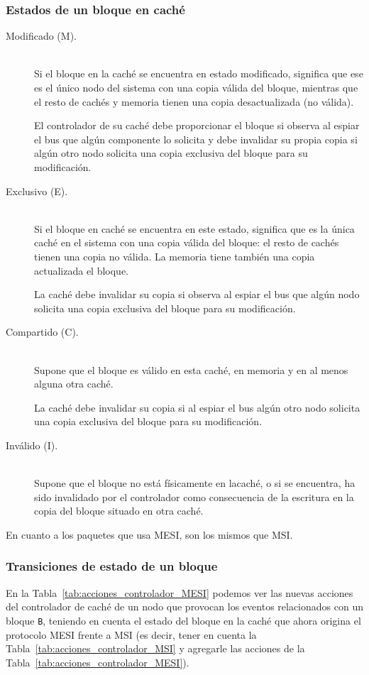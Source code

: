 \subsubsection{Estados de un bloque en caché}
\begin{description}
    \item [Modificado (M).]~\\
        Si el bloque en la caché se encuentra en estado modificado, significa que ese es el único nodo del sistema con una copia válida del bloque, mientras que el resto de cachés y memoria tienen una copia desactualizada (no válida).

        El controlador de su caché debe proporcionar el bloque si observa al espiar el bus que algún componente lo solicita y debe invalidar su propia copia si algún otro nodo solicita una copia exclusiva del bloque para su modificación.
    \item [Exclusivo (E).]~\\
        Si el bloque en caché se encuentra en este estado, significa que es la única caché en el sistema con una copia válida del bloque: el resto de cachés tienen una copia no válida. La memoria tiene también una copia actualizada el bloque. 

        La caché debe invalidar su copia si observa al espiar el bus que algún nodo solicita una copia exclusiva del bloque para su modificación.
    \item [Compartido (C).]~\\
        Supone que el bloque es válido en esta caché, en memoria y en al menos alguna otra caché. 

        La caché debe invalidar su copia si al espiar el bus algún otro nodo solicita una copia exclusiva del bloque para su modificación.
    \item [Inválido (I).]~\\
        Supone que el bloque no está físicamente en lacaché, o si se encuentra, ha sido invalidado por el controlador como consecuencia de la escritura en la copia del bloque situado en otra caché.
\end{description}
En cuanto a los paquetes que usa MESI, son los mismos que MSI\@.

\subsubsection{Transiciones de estado de un bloque}
En la Tabla~\ref{tab:acciones_controlador_MESI} podemos ver las nuevas acciones del controlador de caché de un nodo que provocan los eventos relacionados con un bloque \verb|B|, teniendo en cuenta el estado del bloque en la caché que ahora origina el protocolo MESI frente a MSI (es decir, tener en cuenta la Tabla~\ref{tab:acciones_controlador_MSI} y agregarle las acciones de la Tabla~\ref{tab:acciones_controlador_MESI}).

